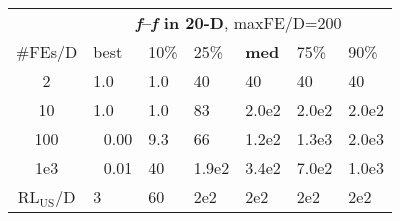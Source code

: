 \begin{tabular}{c|llllll}
 & \multicolumn{6}{|c}{\textbf{\textit{f}\raisebox{-0.35ex}{1}--\textit{f}\raisebox{-0.35ex}{24} in 20-D}, maxFE/D=200}\\
\#FEs/D & best & 10\% & 25\% & \textbf{med} & 75\% & 90\%\\
2 & \hspace*{1ex}1.0 & \hspace*{1ex}1.0 & 40 & 40 & 40 & 40\\
10 & \hspace*{1ex}1.0 & \hspace*{1ex}1.0 & 83 & 2.0e2 & 2.0e2 & 2.0e2\\
100 & ~\,0.00 & \hspace*{1ex}9.3 & 66 & 1.2e2 & 1.3e3 & 2.0e3\\
1e3 & ~\,0.01 & 40 & 1.9e2 & 3.4e2 & 7.0e2 & 1.0e3\\
$\text{RL}_{\text{US}}$/D & 3 & 60 & 2e2 & 2e2 & 2e2 & 2e2
\end{tabular}
